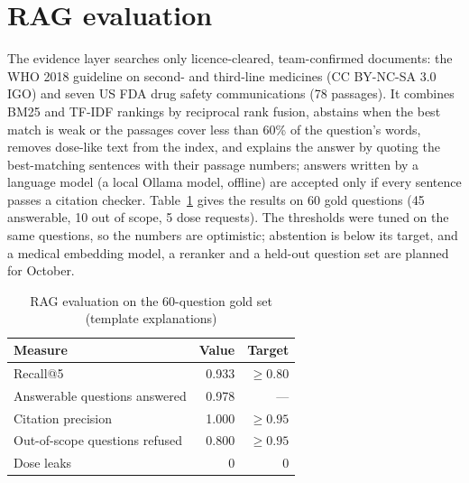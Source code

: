 \section{RAG evaluation}
The evidence layer searches only licence-cleared, team-confirmed documents: the WHO 2018 guideline on second- and third-line medicines (CC BY-NC-SA 3.0 IGO) and seven US FDA drug safety communications (78 passages). It combines BM25 and TF-IDF rankings by reciprocal rank fusion, abstains when the best match is weak or the passages cover less than 60\% of the question's words, removes dose-like text from the index, and explains the answer by quoting the best-matching sentences with their passage numbers; answers written by a language model (a local Ollama model, offline) are accepted only if every sentence passes a citation checker. Table~\ref{tab:rag} gives the results on 60 gold questions (45 answerable, 10 out of scope, 5 dose requests). The thresholds were tuned on the same questions, so the numbers are optimistic; abstention is below its target, and a medical embedding model, a reranker and a held-out question set are planned for October.
\begin{table}[H]\centering\caption{RAG evaluation on the 60-question gold set (template explanations)}\label{tab:rag}
\begin{tabular}{lrr}\toprule
Measure & Value & Target\\\midrule
Recall@5 & 0.933 & $\ge 0.80$\\
Answerable questions answered & 0.978 & ---\\
Citation precision & 1.000 & $\ge 0.95$\\
Out-of-scope questions refused & 0.800 & $\ge 0.95$\\
Dose leaks & 0 & 0\\\bottomrule
\end{tabular}\end{table}

